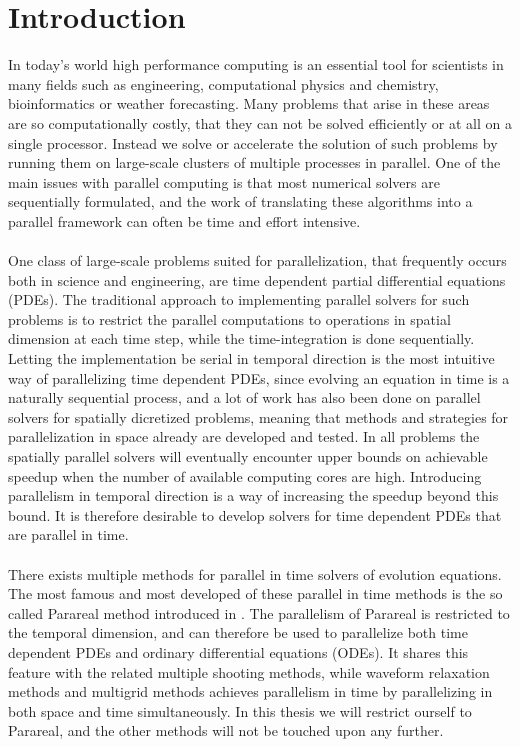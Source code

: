 \chapter{Introduction}
In today’s world high performance computing is an essential tool for scientists in many fields such as engineering, computational physics and chemistry, bioinformatics or weather forecasting. Many problems that arise in these areas are so computationally costly, that they can not be solved efficiently or at all on a single processor. Instead we solve or accelerate the solution of such problems by running them on large-scale clusters of multiple processes in parallel. One of the main issues with parallel computing is that most numerical solvers are sequentially formulated, and the work of translating these algorithms into a parallel framework can often be time and effort intensive.
\\
\\
One class of large-scale problems suited for parallelization, that frequently occurs both in science and engineering, are time dependent partial differential equations (PDEs). The traditional approach to implementing parallel solvers for such problems is to restrict the parallel computations to operations in spatial dimension at each time step, while the time-integration is done sequentially. Letting the implementation be serial in temporal direction is the most intuitive way of parallelizing time dependent PDEs, since evolving an equation in time is a naturally sequential process, and a lot of work has also been done on parallel solvers for spatially dicretized problems, meaning that methods and strategies for parallelization in space already are developed and tested. In all problems the spatially parallel solvers will eventually encounter upper bounds on achievable speedup when the number of available computing cores are high. Introducing parallelism in temporal direction is a way of increasing the speedup beyond this bound. It is therefore desirable to develop solvers for time dependent PDEs that are parallel in time.
\\
\\
There exists multiple methods for parallel in time solvers of evolution equations. The most famous and most developed of these parallel in time methods is the so called Parareal method introduced in \cite{lions2001resolution}. The parallelism of Parareal is restricted to the temporal dimension, and can therefore be used to parallelize both time dependent PDEs and ordinary differential equations (ODEs). It shares this feature with the related multiple shooting methods\cite{nievergelt1964parallel,bellen1989parallel}, while waveform relaxation methods\cite{lelarasmee1982waveform,gander1996overlapping} and multigrid methods\cite{hackbusch1985parabolic,lubich1987multi,horton1995space} achieves parallelism in time by parallelizing in both space and time simultaneously. In this thesis we will restrict ourself to Parareal, and the other methods will not be touched upon any further.
